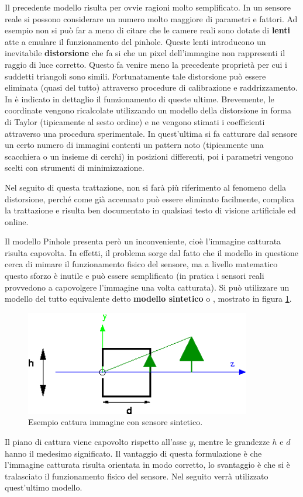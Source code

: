 Il precedente modello risulta per ovvie ragioni molto semplificato. In un sensore reale si possono considerare un numero molto maggiore di parametri e fattori. Ad esempio non si può far a meno di citare che le camere reali sono dotate di \textbf{lenti} atte a emulare il funzionamento del pinhole. Queste lenti introducono un inevitabile \textbf{distorsione} che fa si che un pixel dell'immagine non rappresenti il raggio di luce corretto. Questo fa venire meno la precedente proprietà per cui i suddetti triangoli sono simili. Fortunatamente tale distorsione può essere eliminata (quasi del tutto) attraverso procedure di calibrazione e raddrizzamento. In \cite{bib5} è indicato in dettaglio il funzionamento di queste ultime. Brevemente, le coordinate vengono ricalcolate utilizzando un modello della distorsione in forma di Taylor (tipicamente al sesto ordine) e ne vengono stimati i coefficienti attraverso una procedura sperimentale. In quest'ultima si fa catturare dal sensore un certo numero di immagini contenti un pattern noto (tipicamente una scacchiera o un insieme di cerchi) in posizioni differenti, poi i parametri vengono scelti con strumenti di minimizzazione.

Nel seguito di questa trattazione, non si farà più riferimento al fenomeno della distorsione, perché come già accennato può essere eliminato facilmente, complica la trattazione e risulta ben documentato in qualsiasi testo di visione artificiale ed online. 

Il modello Pinhole presenta però un inconveniente, cioè l'immagine catturata risulta capovolta. In effetti, il problema sorge dal fatto che il modello in questione cerca di mimare il funzionamento fisico del sensore, ma a livello matematico questo sforzo è inutile e può essere semplificato (in pratica i sensori reali provvedono a capovolgere l'immagine una volta catturata).
Si può utilizzare un modello del tutto equivalente detto \textbf{modello sintetico} o , mostrato in figura \ref{vis:stereo:virtuale}.
\begin{figure}[h!]
	\centering
	\includegraphics[width=280pt]{imgs/synthetic-and-tree.png}
	\caption{Esempio cattura immagine con sensore sintetico.}
	\label{vis:stereo:virtuale}
\end{figure} 
Il piano di cattura viene capovolto rispetto all'asse $y$, mentre le grandezze $h$ e $d$ hanno il medesimo significato. Il vantaggio di questa formulazione è che l'immagine catturata risulta orientata in modo corretto, lo svantaggio è che si è tralasciato il funzionamento fisico del sensore. Nel seguito verrà utilizzato quest'ultimo modello.

